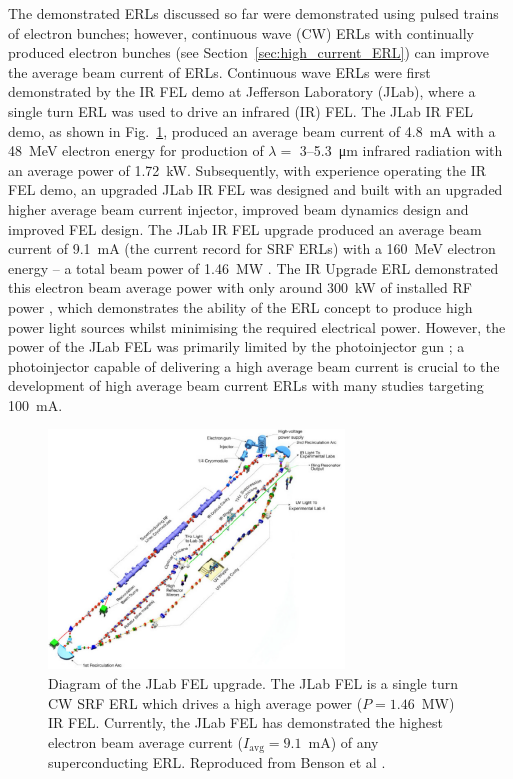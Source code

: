 \documentclass[../main.tex]{subfiles}
\begin{document}
The demonstrated ERLs discussed so far were demonstrated using pulsed trains of electron bunches; however, continuous wave (CW) ERLs with continually produced electron bunches (see Section~\ref{sec:high_current_ERL}) can improve the average beam current of ERLs. Continuous wave ERLs were first demonstrated \cite{neil2000sustained} by the IR FEL demo \cite{benson1999first,neil2000sustained} at Jefferson Laboratory (JLab), where a single turn ERL was used to drive an infrared (IR) FEL. The JLab IR FEL demo, as shown in Fig.~\ref{fig:J_Lab_FEL_diagram}, produced an average beam current of 4.8~\si{\milli\ampere} with a 48~\si{\mega\electronvolt} electron energy for production of $\lambda =$ 3--5.3~\si{\micro\meter} infrared radiation with an average power of 1.72~\si{\kilo\watt}. Subsequently, with experience operating the IR FEL demo, an upgraded JLab IR FEL was designed \cite{benson2002have} and built \cite{behre2004first} with an upgraded higher average beam current injector, improved beam dynamics design and improved FEL design. The JLab IR FEL upgrade produced an average beam current of 9.1~\si{\milli\ampere} (the current record for SRF ERLs) with a 160~\si{\mega\electronvolt} electron energy -- a total beam power of 1.46~\si{\mega\watt} \cite{neil2006jlab}. The IR Upgrade ERL demonstrated this electron beam average power with only around 300~\si{\kilo\watt} of installed RF power \cite{adolphsen2022european}, which demonstrates the ability of the ERL concept to produce high power light sources whilst minimising the required electrical power. However, the power of the JLab FEL was primarily limited by the photoinjector gun \cite{hannon2008high}; a photoinjector capable of delivering a high average beam current is crucial to the development of high average beam current ERLs with many studies \cite{hannon2008high,dunham2013record,neumann2013towards} targeting 100~\si{\milli\ampere}.   
\begin{figure}[!h]
\centering
\includegraphics[width=0.7\textwidth]{Figures/Introduction/JLab_FEL.pdf}
\caption{Diagram of the JLab FEL upgrade. The JLab FEL is a single turn CW SRF ERL which drives a high average power ($P = 1.46$~\si{\mega\watt}) IR FEL. Currently, the JLab FEL has demonstrated the highest electron beam average current ($I_{\mathrm{avg}} = 9.1$~\si{\milli\ampere}) of any superconducting ERL. Reproduced from Benson et al \cite{benson2009jlamp}.}
\label{fig:J_Lab_FEL_diagram}
\end{figure}
\end{document}
